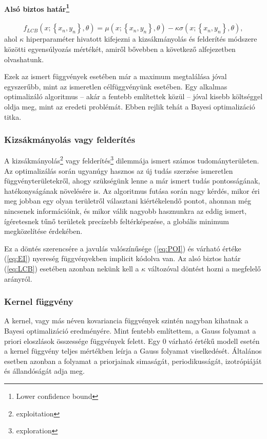 \paragraph[Alsó biztos határ]{Alsó biztos határ\footnote{Lower confidence bound}}
\begin{equation}
	\label{eq:LCB}
	f_{LCB}(x;\left\lbrace x_n,y_n\right\rbrace ,\theta)=\mu(x;\left\lbrace x_n,y_n\right\rbrace ,\theta)-\kappa \sigma(x;\left\lbrace x_n,y_n\right\rbrace ,\theta),
\end{equation}
ahol $\kappa$ hiperparaméter hivatott kifejezni a kizsákmányolás és felderítés módszere közötti egyensúlyozás mértékét, amiről bővebben a következő alfejezetben olvashatunk.

Ezek az ismert függvények esetében már a maximum megtalálása jóval egyszerűbb, mint az ismeretlen célfüggvényünk esetében. Egy alkalmas optimalizáló algoritmus -- akár a fentebb említettek közül -- jóval kisebb költséggel oldja meg, mint az eredeti problémát. Ebben rejlik tehát a Bayesi optimalizáció titka.

\subsubsection{Kizsákmányolás vagy felderítés}
A kizsákmányolás\footnote{exploitation} vagy felderítés\footnote{exploration} dilemmája ismert számos tudományterületen. Az optimalizálás során ugyanúgy hasznos az új tudás szerzése ismeretlen függvényterületekről, ahogy szükségünk lenne a már ismert tudás pontosságának, hatékonyságának növelésére is. Az algoritmus futása során nagy kérdés, mikor éri meg jobban egy olyan területről választani kiértékelendő pontot, ahonnan még nincsenek információink, és mikor válik nagyobb hasznunkra az eddig ismert, ígéretesnek tűnő területek precízebb feltérképezése, a globális minimum megközelítése érdekében.

Ez a döntés szerencsére a javulás valószínűsége (\ref{eq:POI}) és várható értéke (\ref{eq:EI}) nyereség függvényekben implicit kódolva van. Az alsó biztos határ (\ref{eq:LCB}) esetében azonban nekünk kell a $\kappa$ változóval döntést hozni a megfelelő arányról.

\subsubsection{Kernel függvény}
A kernel, vagy más néven kovariancia függvények szintén nagyban kihatnak a Bayesi optimalizáció eredményére. Mint fentebb említettem, a Gauss folyamat a priori eloszlások összessége függvények felett.
Egy 0 várható értékű modell esetén a kernel függvény teljes mértékben leírja a Gauss folyamat viselkedését.
Általános esetben azonban a folyamat a priorjainak simaságát, periodikusságát, izotrópiáját és állandóságát adja meg.

